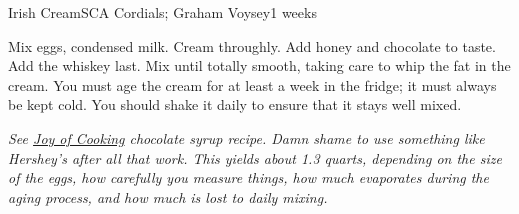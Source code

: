 \begin{recipe}{Irish Cream}{SCA Cordials; Graham Voysey}{1 weeks}

  Mix eggs, condensed milk. Cream throughly. Add honey and chocolate to
  taste. Add the whiskey last. Mix until totally smooth, taking care to
  whip the fat in the cream. You must age the cream for at least a week in
  the fridge; it must always be kept cold. You should shake it daily to
  ensure that it stays well mixed.
\end{recipe}
\textit{See \underline{Joy of Cooking} chocolate syrup recipe. Damn shame to
  use something like Hershey's after all that work. This yields about 1.3
  quarts, depending on the size of the eggs, how carefully you measure things,
  how much evaporates during the aging process, and how much is lost to daily
  mixing.}
